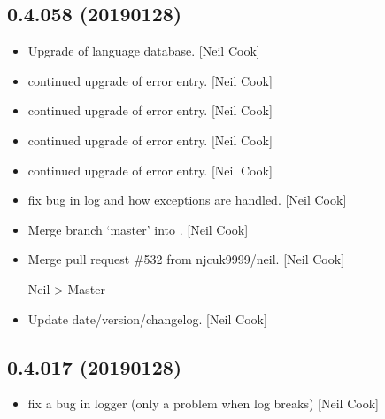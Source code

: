 \documentclass[a4paper,10pt,english]{report}
\begin{document}
\subsection{0.4.058 (2019\sphinxhyphen{}01\sphinxhyphen{}28)}
\label{\detokenize{misc/changelog:id224}}\begin{itemize}
\item {} 
Upgrade of language database. {[}Neil Cook{]}

\item {} 
 \sphinxhyphen{} continued upgrade of error entry. {[}Neil Cook{]}

\item {} 
 \sphinxhyphen{} continued upgrade of error entry. {[}Neil Cook{]}

\item {} 
 \sphinxhyphen{} continued upgrade of error entry. {[}Neil Cook{]}

\item {} 
 \sphinxhyphen{} continued upgrade of error entry. {[}Neil Cook{]}

\item {} 
 \sphinxhyphen{} fix bug in log and how exceptions are handled. {[}Neil
Cook{]}

\item {} 
Merge branch ‘master’ into . {[}Neil Cook{]}

\item {} 
Merge pull request \#532 from njcuk9999/neil. {[}Neil Cook{]}

Neil \sphinxhyphen{}\textgreater{} Master

\item {} 
Update date/version/changelog. {[}Neil Cook{]}

\end{itemize}


\subsection{0.4.017 (2019\sphinxhyphen{}01\sphinxhyphen{}28)}
\label{\detokenize{misc/changelog:id225}}\begin{itemize}
\item {} 
 \sphinxhyphen{} fix a bug in logger (only a problem when log breaks)
{[}Neil Cook{]}

\end{itemize}
\end{document}
